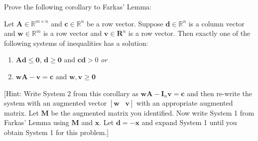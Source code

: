 \begin{exercise} Prove the following corollary to Farkas' Lemma:
\begin{corollary} Let $\mathbf{A} \in \mathbb{R}^{m \times n}$ and $\mathbf{c} \in \mathbb{R}^n$ be a row vector. Suppose $\mathbf{d} \in \mathbb{R}^n$ is a column vector and $\mathbf{w} \in \mathbb{R}^m$ is a row vector and $\mathbf{v} \in \mathbf{R}^{n}$ is a row vector. Then exactly one of the following systems of inequalities has a solution:
\begin{enumerate}
\item $\mathbf{A}\mathbf{d} \leq \mathbf{0}$, $\mathbf{d} \geq \mathbf{0}$ and $\mathbf{c}\mathbf{d} > 0$ \textit{or}
\item $\mathbf{w}\mathbf{A} - \mathbf{v} = \mathbf{c}$ and $\mathbf{w}, \mathbf{v} \geq \mathbf{0}$
\end{enumerate}
\end{corollary}
[Hint: Write System 2 from this corollary as $\mathbf{w}\mathbf{A} - \mathbf{I}_n \mathbf{v} = \mathbf{c}$ and then re-write the system with an augmented vector $[\mathbf{w}\;\;\;\mathbf{v}]$ with an appropriate augmented matrix. Let $\mathbf{M}$ be the augmented matrix you identified. Now write System 1 from Farkas' Lemma using $\mathbf{M}$ and $\mathbf{x}$. Let $\mathbf{d} = -\mathbf{x}$ and expand System 1 until you obtain System 1 for this problem.]

\end{exercise}
